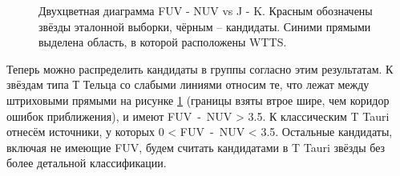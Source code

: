 \begin{figure}[ht]
\hfill
\caption{Двухцветная диаграмма FUV - NUV vs J - K. Красным обозначены звёзды эталонной выборки, чёрным -- кандидаты. Синими прямыми выделена область, в которой расположены WTTS.}
\label{fig:trend}
\end{figure}

Теперь можно распределить кандидаты в группы согласно этим результатам. К звёздам типа Т Тельца со слабыми линиями относим те, что лежат между штриховыми прямыми на рисунке \ref{fig:trend} (границы взяты втрое шире, чем коридор ошибок приближения), и имеют FUV~-~NUV > 3.5. К классическим T Tauri отнесём источники, у которых 0 < FUV~-~NUV < 3.5. Остальные кандидаты, включая не имеющие FUV, будем считать кандидатами в T Tauri звёзды без более детальной классификации.



